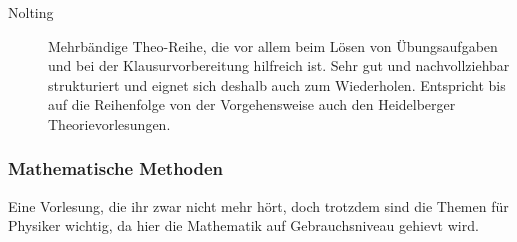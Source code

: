 \begin{description}

\item[Nolting]{Mehrbändige Theo-Reihe, die vor allem beim Lösen von
Übungsaufgaben und bei der Klausurvorbereitung hilfreich ist. Sehr
gut und nachvollziehbar strukturiert und eignet sich deshalb auch
zum Wiederholen. Entspricht bis auf die Reihenfolge von der
Vorgehensweise auch den Heidelberger Theorievorlesungen.
}



\end{description}


\subsubsection{Mathematische Methoden}

Eine Vorlesung, die ihr zwar nicht mehr hört, doch trotzdem sind die
Themen für
Physiker wichtig, da hier die Mathematik auf Gebrauchsniveau gehievt
wird.

